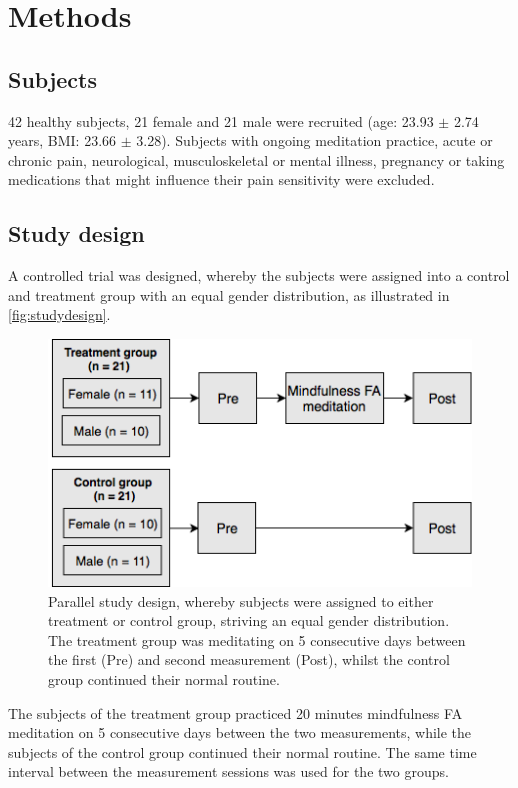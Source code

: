 \section{Methods}
\subsection{Subjects}
42 healthy subjects, 21 female and 21 male were recruited (age: 23.93 $\pm$ 2.74 years, BMI: 23.66 $\pm$ 3.28). Subjects with ongoing meditation practice, acute or chronic pain, neurological, musculoskeletal or mental illness, pregnancy or taking medications that might influence their pain sensitivity were excluded.

\subsection{Study design}
A controlled trial was designed, whereby the subjects were assigned into a control and treatment group with an equal gender distribution, as illustrated in \autoref{fig:studydesign}.

\begin{figure}[H]
\centering
\includegraphics[width=1\columnwidth]{../figures/studydesign_aa.png}
\caption{Parallel study design, whereby subjects were assigned to either treatment or control group, striving an equal gender distribution. The treatment group was meditating on 5 consecutive days between the first (Pre) and second measurement (Post), whilst the control group continued their normal routine.}
\label{fig:studydesign}
\end{figure} 

\noindent 
The subjects of the treatment group practiced 20 minutes mindfulness FA meditation on 5 consecutive days between the two measurements, while the subjects of the control group continued their normal routine. The same time interval between the measurement sessions was used for the two groups.

